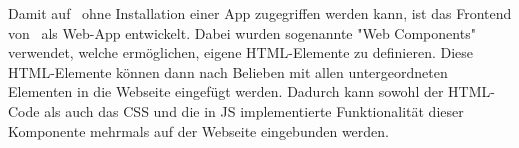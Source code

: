 \label{sec:webcomponents}

Damit auf \ZELIA\ ohne Installation einer App zugegriffen werden kann, ist das Frontend von \ZELIA\ als Web-App entwickelt. Dabei wurden sogenannte "Web Components" verwendet, welche ermöglichen, eigene HTML-Elemente zu definieren. Diese HTML-Elemente können dann nach Belieben mit allen untergeordneten Elementen in die Webseite eingefügt werden. Dadurch kann sowohl der HTML-Code als auch das CSS und die in JS implementierte Funktionalität dieser Komponente mehrmals auf der Webseite eingebunden werden.


\pagebreak
